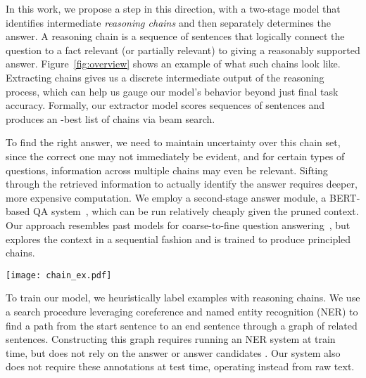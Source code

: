 \documentclass[11pt,a4paper]{article}
\begin{document}
In this work, we propose a step in this direction, with a two-stage model that identifies intermediate \emph{reasoning chains} and then separately determines the answer. A reasoning chain is a sequence of sentences that logically connect the question to a fact relevant (or partially relevant) to giving a reasonably supported answer. Figure~\ref{fig:overview} shows an example of what such chains look like. Extracting chains gives us a discrete intermediate output of the reasoning process, which can help us gauge our model's behavior beyond just final task accuracy. Formally, our extractor model scores sequences of sentences and produces an -best list of chains via beam search.

To find the right answer, we need to maintain uncertainty over this chain set, since the correct one may not immediately be evident, and for certain types of questions, information across multiple chains may even be relevant. Sifting through the retrieved information to actually identify the answer requires deeper, more expensive computation. We employ a second-stage answer module, a BERT-based QA system~\citep{devlin2018bert}, which can be run relatively cheaply given the pruned context. Our approach resembles past models for coarse-to-fine question answering~\citep{choi2017coarse, min2018efficient, wang2019evidence}, but explores the context in a sequential fashion and is trained to produce principled chains.



\begin{figure*}[t]
\centering
\texttt{[image: chain\_ex.pdf]}
\caption{A multi-hop example chosen from the HotpotQA development set. Several documents are given as context to answer a question. We show two possible ``reasoning chains'' that leverage connections (shared entities or coreference relations) between sentences to arrive at the answer. The first chain is most appropriate, while the second requires a less well-supported inferential leap.}
\vspace{-0.5cm}
    \label{fig:overview}
\end{figure*}

To train our model, we heuristically label examples with reasoning chains. We use a search procedure leveraging coreference and named entity recognition (NER) to find a path from the start sentence to an end sentence through a graph of related sentences. Constructing this graph requires running an NER system at train time, but does not rely on the answer or answer candidates \citep{kundu2018exploiting}. Our system also does not require these annotations at test time, operating instead from raw text.
\end{document}

